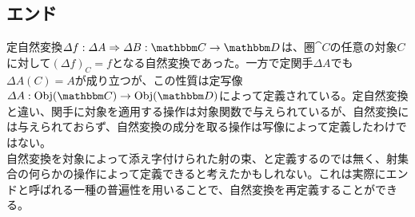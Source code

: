 	\subsection{エンド}
  定自然変換$\natf{\varDelta f}{\varDelta A}{\varDelta B}{C}{D}$は、圏$\cat{C}$の任意の対象$C$に対して$(\varDelta f)_C=f$となる自然変換であった。一方で定関手$\varDelta A$でも$\varDelta A(C)=A$が成り立つが、この性質は定写像$\mor{\varDelta A}{\obj{C}}{\obj{D}}$によって定義されている。定自然変換と違い、関手に対象を適用する操作は対象関数で与えられているが、自然変換には与えられておらず、自然変換の成分を取る操作は写像によって定義したわけではない。\\
  自然変換を対象によって添え字付けられた射の束、と定義するのでは無く、射集合の何らかの操作によって定義できると考えたかもしれない。これは実際にエンドと呼ばれる一種の普遍性を用いることで、自然変換を再定義することができる。\\
